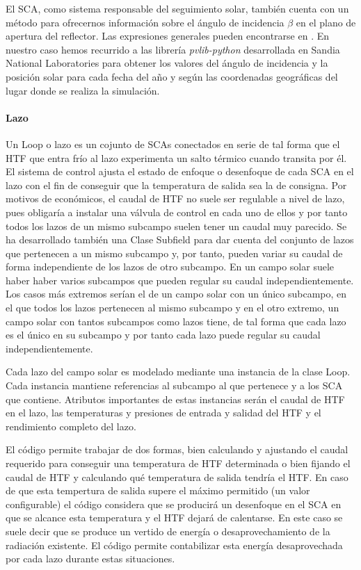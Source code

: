 El SCA, como sistema responsable del seguimiento solar, también cuenta
con un método para ofrecernos información sobre el ángulo de incidencia
\(\beta\) en el plano de apertura del reflector. Las expresiones
generales pueden encontrarse en \cite{1022085/95AM6AQN}. En nuestro caso
hemos recurrido a las librería \emph{pvlib-python}
\cite{1022085/GUC54R5I} desarrollada en Sandia National Laboratories
para obtener los valores del ángulo de incidencia y la posición solar
para cada fecha del año y según las coordenadas geográficas del lugar
donde se realiza la simulación.

\hypertarget{lazo}{%
\paragraph{Lazo}\label{lazo}}

Un Loop o lazo es un cojunto de SCAs conectados en serie de tal forma
que el HTF que entra frío al lazo experimenta un salto térmico cuando
transita por él. El sistema de control ajusta el estado de enfoque o
desenfoque de cada SCA en el lazo con el fin de conseguir que la
temperatura de salida sea la de consigna. Por motivos de económicos, el
caudal de HTF no suele ser regulable a nivel de lazo, pues obligaría a
instalar una válvula de control en cada uno de ellos y por tanto todos
los lazos de un mismo subcampo suelen tener un caudal muy parecido. Se
ha desarrollado también una Clase Subfield para dar cuenta del conjunto
de lazos que pertenecen a un mismo subcampo y, por tanto, pueden variar
su caudal de forma independiente de los lazos de otro subcampo. En un
campo solar suele haber haber varios subcampos que pueden regular su
caudal independientemente. Los casos más extremos serían el de un campo
solar con un único subcampo, en el que todos los lazos pertenecen al
mismo subcampo y en el otro extremo, un campo solar con tantos subcampos
como lazos tiene, de tal forma que cada lazo es el único en su subcampo
y por tanto cada lazo puede regular su caudal independientemente.

Cada lazo del campo solar es modelado mediante una instancia de la clase
Loop. Cada instancia mantiene referencias al subcampo al que pertenece y
a los SCA que contiene. Atributos importantes de estas instancias serán
el caudal de HTF en el lazo, las temperaturas y presiones de entrada y
salidad del HTF y el rendimiento completo del lazo.

El código permite trabajar de dos formas, bien calculando y ajustando el
caudal requerido para conseguir una temperatura de HTF determinada o
bien fijando el caudal de HTF y calculando qué temperatura de salida
tendría el HTF. En caso de que esta tempertura de salida supere el
máximo permitido (un valor configurable) el código considera que se
producirá un desenfoque en el SCA en que se alcance esta temperatura y
el HTF dejará de calentarse. En este caso se suele decir que se produce
un vertido de energía o desaprovechamiento de la radiación existente. El
código permite contabilizar esta energía desaprovechada por cada lazo
durante estas situaciones.

